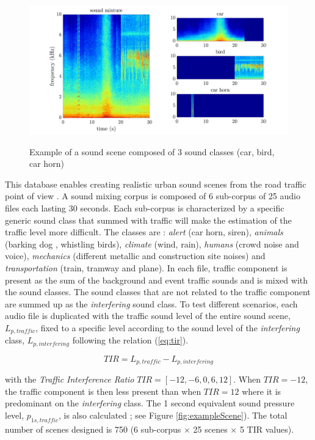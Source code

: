 \documentclass[twocolumn,a4paper,10pt]{article}
\begin{document}
\begin{figure}[t]
\centering
\includegraphics[width=\linewidth]{figures/exampleSimScene2.pdf}
\label{fig:exampleSimScene}
\caption{Example of a sound scene composed of 3 sound classes (car, bird, car horn)}
\end{figure}

This database enables creating realistic urban sound scenes from the road traffic point of view \cite{gloaguen_creation_2017}. A sound mixing corpus is composed of 6 sub-corpus of 25 audio files each lasting 30 seconds. Each sub-corpus is characterized by a specific generic sound class that summed with traffic will make the estimation of the traffic level more difficult. The classes are : \textit{alert} (car horn, siren), \textit{animals} (barking dog , whistling birds), \textit{climate} (wind, rain), \textit{humans} (crowd noise and voice), \textit{mechanics} (different metallic and construction site noises) and \textit{transportation} (train, tramway and plane). In each file, traffic component is present as the sum of the background and event traffic sounds and is mixed with the sound classes. The sound classes that are not related to the traffic component are summed up as the \textit{interfering} sound class. To test different scenarios, each audio file is duplicated with the traffic sound level of the entire sound scene, $L_{p,traffic}$, fixed to a specific level according to the sound level of the \textit{interfering} class, $L_{p,interfering}$ following the relation (\ref{eq:tir}).

\begin{equation}\label{eq:tir}
TIR = L_{p,traffic}-L_{p,interfering}
\end{equation}

with the \textit{Traffic Interference Ratio} $TIR = \left[-12, -6, 0, 6, 12\right]$. When $TIR = -12$, the traffic component is then less present than when $TIR = 12$ where it is predominant on the \textit{interfering} class. The 1 second equivalent sound pressure level, $p_{1s,traffic}$, is also calculated ; see Figure \ref{fig:exampleScene}). The total number of scenes designed is 750 (6 sub-corpus $\times$ 25 scenes $\times$  5 TIR values).
\end{document}
